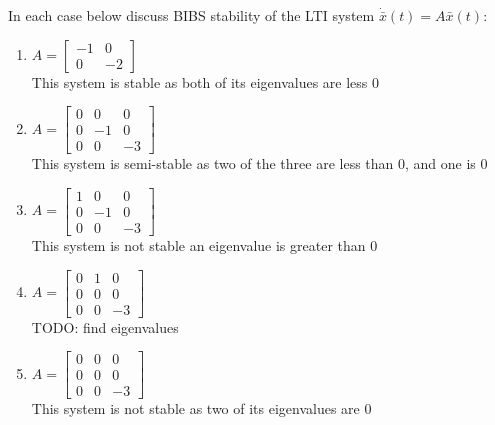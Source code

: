 \item In each case below discuss BIBS stability of the LTI system $\dot {\bar x}(t) = A\bar x(t)$:
  \begin{enumerate}
  \item $A = \begin{bmatrix} -1 & 0 \\ 0 & -2 \end{bmatrix}$ \\
    This system is stable as both of its eigenvalues are less 0
  \item $A = \begin{bmatrix} 0 & 0 & 0\\ 0 & -1 & 0\\ 0 & 0 & -3 \end{bmatrix}$\\
    This system is semi-stable as two of the three are less than 0, and one is 0
  \item $A = \begin{bmatrix} 1 & 0 & 0\\ 0 & -1 & 0\\ 0 & 0 & -3 \end{bmatrix}$\\
    This system is not stable an eigenvalue is greater than 0
  \item $A = \begin{bmatrix} 0 & 1 & 0\\ 0 & 0 & 0\\ 0 & 0 & -3 \end{bmatrix}$\\
    {\LARGE \color{red} TODO: find eigenvalues}
  \item $A = \begin{bmatrix} 0 & 0 & 0\\ 0 & 0 & 0\\ 0 & 0 & -3 \end{bmatrix}$\\
    This system is not stable as two of its eigenvalues are 0
  \end{enumerate}